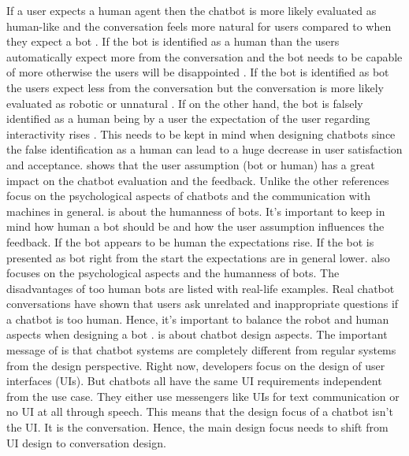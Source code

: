 If a user expects a human agent then the chatbot is more likely evaluated as human-like and the conversation 
feels more natural for users compared to when they expect a bot \cite{sundar2016theoretical}.
If the bot is identified as a human than the users automatically expect more from the conversation and the 
bot needs to be capable of more otherwise the users will be disappointed \cite{GO2019304}.
If the bot is identified as bot the users expect less from the conversation but the conversation 
is more likely evaluated as robotic or unnatural \cite{GO2019304}.
If on the other hand, the bot is falsely identified as a human being by a user the expectation of the user regarding 
interactivity rises \cite{GO2019304}.
This needs to be kept in mind when designing chatbots since the false identification as a human 
can lead to a huge decrease in user satisfaction and acceptance.
\citet{GO2019304} shows that the user assumption (bot or human) has a great impact 
on the chatbot evaluation and the feedback.
Unlike the other references \citet{folstad2017chatbots, brandtzaeg2018chatbots, GO2019304}
focus on the psychological aspects of chatbots and the communication with machines in general.
\citet{GO2019304} is about the humanness of bots.
It's important to keep in mind how human a bot should be and how the user assumption influences 
the feedback.
If the bot appears to be human the expectations rise.
If the bot is presented as bot right from the start the expectations are in general lower.
\citet{brandtzaeg2018chatbots} also focuses on the psychological aspects and the humanness of bots.
The disadvantages of too human bots are listed with real-life examples. 
Real chatbot conversations have shown that users ask unrelated and inappropriate questions 
if a chatbot is too human. 
Hence, it's important to balance the robot and human aspects when designing a bot \cite{brandtzaeg2018chatbots}.
\citet{dutta2017developing} is about chatbot design aspects.
The important message of \citet{dutta2017developing} is that chatbot systems are completely different from regular systems from 
the design perspective.
Right now, developers focus on the design of user interfaces (UIs).
But chatbots all have the same UI requirements independent from the use case.
They either use messengers like UIs for text communication or no UI at all through speech.
This means that the design focus of a chatbot isn't the UI.
It is the conversation.
Hence, the main design focus needs to shift from UI design to conversation design.

